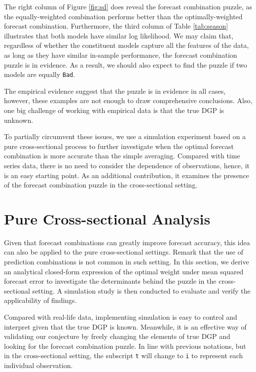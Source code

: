 \documentclass{monashthesis}
\begin{document}
The right column of Figure \ref{fig:sd} does reveal the forecast combination puzzle, as the equally-weighted combination performs better than the optimally-weighted forecast combination. Furthermore, the third column of Table \ref{tab:season} illustrates that both models have similar log likelihood. We may claim that, regardless of whether the constituent models capture all the features of the data, as long as they have similar in-sample performance, the forecast combination puzzle is in evidence. As a result, we should also expect to find the puzzle if two models are equally \texttt{Bad}.

The empirical evidence suggest that the puzzle is in evidence in all cases, however, these examples are not enough to draw comprehensive conclusions. Also, one big challenge of working with empirical data is that the true DGP is unknown.

To partially circumvent these issues, we use a simulation experiment based on a pure cross-sectional process to further investigate when the optimal forecast combination is more accurate than the simple averaging. Compared with time series data, there is no need to consider the dependence of observations, hence, it is an easy starting point. As an additional contribution, it examines the presence of the forecast combination puzzle in the cross-sectional setting.

\hypertarget{pure-cross-sectional-analysis}{%
\chapter{Pure Cross-sectional Analysis}\label{pure-cross-sectional-analysis}}

Given that forecast combinations can greatly improve forecast accuracy, this idea can also be applied to the pure cross-sectional settings. Remark that the use of prediction combinations is not common in such setting. In this section, we derive an analytical closed-form expression of the optimal weight under mean squared forecast error to investigate the determinants behind the puzzle in the cross-sectional setting. A simulation study is then conducted to evaluate and verify the applicability of findings.

Compared with real-life data, implementing simulation is easy to control and interpret given that the true DGP is known. Meanwhile, it is an effective way of validating our conjecture by freely changing the elements of true DGP and looking for the forecast combination puzzle. In line with previous notations, but in the cross-sectional setting, the subscript \texttt{t} will change to \texttt{i} to represent each individual observation.
\end{document}
